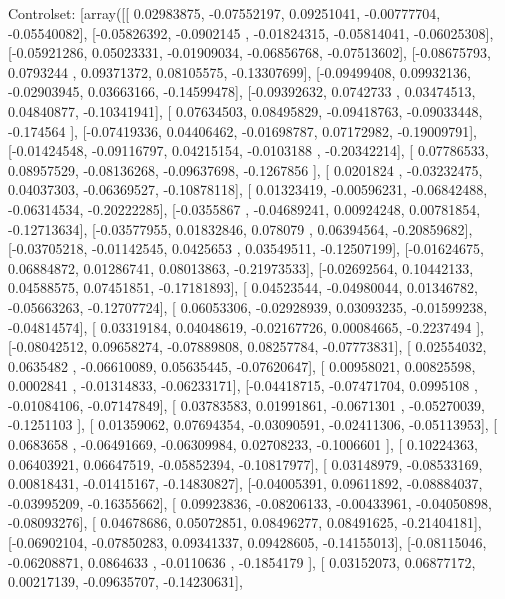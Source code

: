 \documentclass{article}
\begin{document}
Controlset: [array([[ 0.02983875, -0.07552197,  0.09251041, -0.00777704, -0.05540082],
       [-0.05826392, -0.0902145 , -0.01824315, -0.05814041, -0.06025308],
       [-0.05921286,  0.05023331, -0.01909034, -0.06856768, -0.07513602],
       [-0.08675793,  0.0793244 ,  0.09371372,  0.08105575, -0.13307699],
       [-0.09499408,  0.09932136, -0.02903945,  0.03663166, -0.14599478],
       [-0.09392632,  0.0742733 ,  0.03474513,  0.04840877, -0.10341941],
       [ 0.07634503,  0.08495829, -0.09418763, -0.09033448, -0.174564  ],
       [-0.07419336,  0.04406462, -0.01698787,  0.07172982, -0.19009791],
       [-0.01424548, -0.09116797,  0.04215154, -0.0103188 , -0.20342214],
       [ 0.07786533,  0.08957529, -0.08136268, -0.09637698, -0.1267856 ],
       [ 0.0201824 , -0.03232475,  0.04037303, -0.06369527, -0.10878118],
       [ 0.01323419, -0.00596231, -0.06842488, -0.06314534, -0.20222285],
       [-0.0355867 , -0.04689241,  0.00924248,  0.00781854, -0.12713634],
       [-0.03577955,  0.01832846,  0.078079  ,  0.06394564, -0.20859682],
       [-0.03705218, -0.01142545,  0.0425653 ,  0.03549511, -0.12507199],
       [-0.01624675,  0.06884872,  0.01286741,  0.08013863, -0.21973533],
       [-0.02692564,  0.10442133,  0.04588575,  0.07451851, -0.17181893],
       [ 0.04523544, -0.04980044,  0.01346782, -0.05663263, -0.12707724],
       [ 0.06053306, -0.02928939,  0.03093235, -0.01599238, -0.04814574],
       [ 0.03319184,  0.04048619, -0.02167726,  0.00084665, -0.2237494 ],
       [-0.08042512,  0.09658274, -0.07889808,  0.08257784, -0.07773831],
       [ 0.02554032,  0.0635482 , -0.06610089,  0.05635445, -0.07620647],
       [ 0.00958021,  0.00825598,  0.0002841 , -0.01314833, -0.06233171],
       [-0.04418715, -0.07471704,  0.0995108 , -0.01084106, -0.07147849],
       [ 0.03783583,  0.01991861, -0.0671301 , -0.05270039, -0.1251103 ],
       [ 0.01359062,  0.07694354, -0.03090591, -0.02411306, -0.05113953],
       [ 0.0683658 , -0.06491669, -0.06309984,  0.02708233, -0.1006601 ],
       [ 0.10224363,  0.06403921,  0.06647519, -0.05852394, -0.10817977],
       [ 0.03148979, -0.08533169,  0.00818431, -0.01415167, -0.14830827],
       [-0.04005391,  0.09611892, -0.08884037, -0.03995209, -0.16355662],
       [ 0.09923836, -0.08206133, -0.00433961, -0.04050898, -0.08093276],
       [ 0.04678686,  0.05072851,  0.08496277,  0.08491625, -0.21404181],
       [-0.06902104, -0.07850283,  0.09341337,  0.09428605, -0.14155013],
       [-0.08115046, -0.06208871,  0.0864633 , -0.0110636 , -0.1854179 ],
       [ 0.03152073,  0.06877172,  0.00217139, -0.09635707, -0.14230631],
\end{document}
